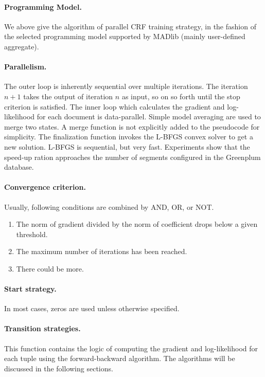 \paragraph{Programming Model.}
We above give the algorithm of parallel CRF training strategy, in the fashion of the selected programming model supported by MADlib (mainly user-defined aggregate).

\paragraph{Parallelism.}
The outer loop is inherently sequential over multiple iterations.
The iteration $n+1$ takes the output of iteration $n$ as input, so on so forth until the stop criterion is satisfied.
The inner loop which calculates the gradient and log-likelihood for each document is data-parallel.
Simple model averaging are used to merge two states.
A merge function is not explicitly added to the pseudocode for simplicity.
The finalization function invokes the L-BFGS convex solver to get a new solution. L-BFGS is sequential, but very fast.
Experiments show that the speed-up ration approaches the number of segments configured in the Greenplum database.

\paragraph{Convergence criterion.}
Usually, following conditions are combined by AND, OR, or NOT.
\begin{enumerate}
    \item The norm of gradient divided by the norm of coefficient drops below a given threshold.
    \item The maximum number of iterations has been reached.
    \item There could be more.
\end{enumerate}

\paragraph{Start strategy.}
In most cases, zeros are used unless otherwise specified.

\paragraph{Transition strategies.}
This function contains the logic of computing the gradient and log-likelihood for each tuple using the forward-backward
algorithm. The algorithms will be discussed in the following sections.

